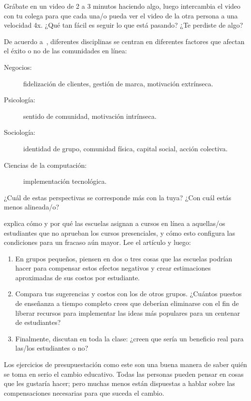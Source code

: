 

Grábate en un video de 2 a 3 minutos haciendo algo,
luego intercambia el video con tu colega
para que cada una/o pueda ver el video de la otra persona a una velocidad 4x.
¿Qué tan fácil es seguir lo que está pasando?
¿Te perdiste de algo?


De acuerdo a~\cite{Irib2009},
diferentes disciplinas se centran en diferentes factores
que afectan el éxito o no de las comunidades en línea:

\begin{description}

\item[Negocios:]
  fidelización de clientes, gestión de marca, motivación extrínseca.

\item[Psicología:]
  sentido de comunidad, motivación intrínseca.

\item[Sociología:]
  identidad de grupo, comunidad física, capital social, acción colectiva.

\item[Ciencias de la computación:]
  implementación tecnológica.

\end{description}

¿Cuál de estas perspectivas se corresponde más con la tuya?
¿Con cuál estás menos alineada/o?


explica cómo y por qué las escuelas asignan a cursos en línea a aquellas/os estudiantes que no aprueban los cursos presenciales,
y cómo esto configura las condiciones para un fracaso aún mayor.
Lee el artículo y luego:

\begin{enumerate}

\item
  En grupos pequeños,
  piensen en dos o tres cosas que las escuelas podrían hacer para compensar estos efectos negativos
  y crear estimaciones aproximadas de sus costos por estudiante.

\item
  Compara tus sugerencias y costos con los de otros grupos.
  ¿Cuántos puestos de enseñanza a tiempo completo crees que deberían eliminarse
  con el fin de liberar recursos para implementar las ideas más populares para un centenar de estudiantes?

\item
  Finalmente, discutan en toda la clase:
  ¿creen que sería un beneficio real para las/los estudiantes o no?

\end{enumerate}

Los ejercicios de presupuestación como este son una buena manera de saber quién se toma en serio el cambio educativo.
Todas las personas pueden pensar en cosas que les gustaría hacer;
pero muchas menos están dispuestas a hablar sobre las compensaciones necesarias para que suceda el cambio.
